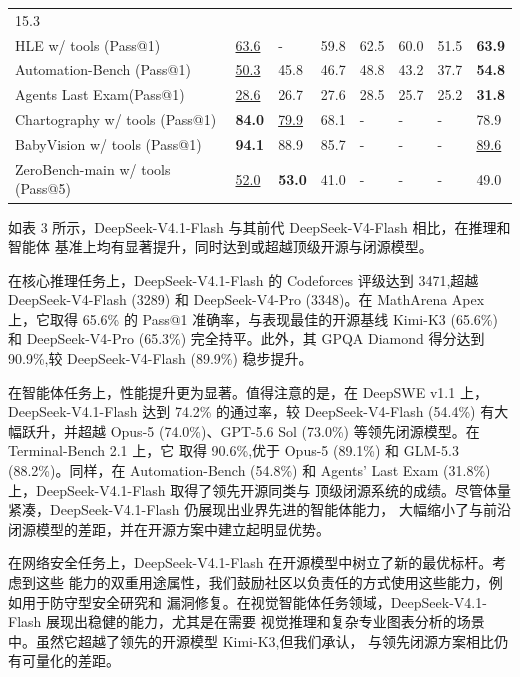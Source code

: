 {\begin{longtable}[]{@{}llllllll@{}}
15.3 \\
HLE w/ tools (Pass@1) & \underline{63.6} & - & 59.8 & 62.5 & 60.0 & 51.5 & \textbf{63.9} \\
Automation-Bench (Pass@1) & \underline{50.3} & 45.8 & 46.7 & 48.8 & 43.2 & 37.7 &
\textbf{54.8} \\
Agents\textquotesingle{} Last Exam(Pass@1) & \underline{28.6} & 26.7 & 27.6 & 28.5 &
25.7 & 25.2 & \textbf{31.8} \\
Chartography w/ tools (Pass@1) & \textbf{84.0} & \underline{79.9} & 68.1 & - & - & - & 78.9 \\
BabyVision w/ tools (Pass@1) & \textbf{94.1} & 88.9 & 85.7 & - & - & - & \underline{89.6} \\
ZeroBench-main w/ tools (Pass@5) & \underline{52.0} & \textbf{53.0} & 41.0 & - & - & - & 49.0 \\
\end{longtable}
}

如表 3 所示，DeepSeek-V4.1-Flash 与其前代 DeepSeek-V4-Flash 相比，在推理和智能体
基准上均有显著提升，同时达到或超越顶级开源与闭源模型。

在核心推理任务上，DeepSeek-V4.1-Flash 的 Codeforces 评级达到 3471,超越
DeepSeek-V4-Flash (3289) 和 DeepSeek-V4-Pro (3348)。在 MathArena Apex 上，它取得
65.6\% 的 Pass@1 准确率，与表现最佳的开源基线 Kimi-K3 (65.6\%) 和
DeepSeek-V4-Pro (65.3\%) 完全持平。此外，其 GPQA Diamond 得分达到 90.9\%,较
DeepSeek-V4-Flash (89.9\%) 稳步提升。

在智能体任务上，性能提升更为显著。值得注意的是，在 DeepSWE v1.1 上，DeepSeek-V4.1-Flash
达到 74.2\% 的通过率，较 DeepSeek-V4-Flash (54.4\%) 有大幅跃升，并超越
Opus-5 (74.0\%)、GPT-5.6 Sol (73.0\%) 等领先闭源模型。在 Terminal-Bench 2.1 上，它
取得 90.6\%,优于 Opus-5 (89.1\%) 和 GLM-5.3 (88.2\%)。同样，在 Automation-Bench
(54.8\%) 和 Agents' Last Exam (31.8\%) 上，DeepSeek-V4.1-Flash 取得了领先开源同类与
顶级闭源系统的成绩。尽管体量紧凑，DeepSeek-V4.1-Flash 仍展现出业界先进的智能体能力，
大幅缩小了与前沿闭源模型的差距，并在开源方案中建立起明显优势。

在网络安全任务上，DeepSeek-V4.1-Flash 在开源模型中树立了新的最优标杆。考虑到这些
能力的双重用途属性，我们鼓励社区以负责任的方式使用这些能力，例如用于防守型安全研究和
漏洞修复。在视觉智能体任务领域，DeepSeek-V4.1-Flash 展现出稳健的能力，尤其是在需要
视觉推理和复杂专业图表分析的场景中。虽然它超越了领先的开源模型 Kimi-K3,但我们承认，
与领先闭源方案相比仍有可量化的差距。



